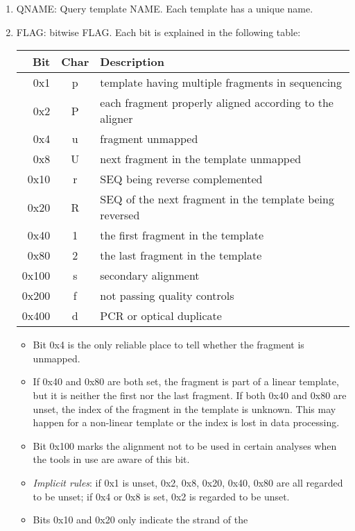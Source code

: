 \documentclass[10pt]{article}
\begin{document}
\begin{enumerate}
\item {\sf QNAME}: Query template NAME. Each template has a unique name.
\item {\sf FLAG}: bitwise FLAG. Each bit is explained in the following
  table:
  \begin{center}
  \begin{tabular}{rcl}
  \hline
  Bit & Char & Description\\
  \hline
  0x1 & p & template having multiple fragments in sequencing \\
  0x2 & P & each fragment properly aligned according to the aligner \\
  0x4 & u & fragment unmapped \\
  0x8 & U & next fragment in the template unmapped \\
  0x10 & r & {\sf SEQ} being reverse complemented \\
  0x20 & R & {\sf SEQ} of the next fragment in the template being reversed \\
  0x40 & 1 & the first fragment in the template \\
  0x80 & 2 & the last fragment in the template \\
  0x100 & s & secondary alignment\\
  0x200 & f & not passing quality controls \\
  0x400 & d & PCR or optical duplicate \\
  \hline
  \end{tabular}
  \end{center}
  \begin{itemize}
  \item Bit 0x4 is the only reliable place to tell whether the fragment is unmapped.
  \item If 0x40 and 0x80 are both set, the fragment is part of a linear
    template, but it is neither the first nor the last fragment. If both
    0x40 and 0x80 are unset, the index of the fragment in the template
    is unknown. This may happen for a non-linear template or the index
    is lost in data processing.
  \item Bit 0x100 marks the alignment not to be used in certain analyses
    when the tools in use are aware of this bit.
  \item \emph{Implicit rules}: if 0x1 is unset, 0x2, 0x8, 0x20, 0x40,
    0x80 are all regarded to be unset; if 0x4 or 0x8 is set, 0x2 is
    regarded to be unset.
  \item Bits 0x10 and 0x20 only indicate the strand of the

\end{itemize}
\end{enumerate}
\end{document}
